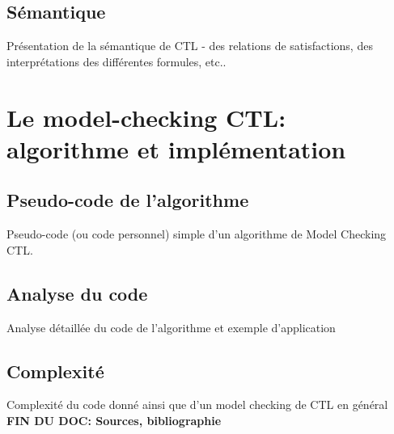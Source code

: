\documentclass[runningheads,a4paper,10pt]{llncs}
\begin{document}
\subsection{Sémantique}
Présentation de la sémantique de CTL - des relations de satisfactions, des interprétations des différentes formules, etc.. 

\section{Le model-checking CTL: algorithme et implémentation}
\subsection{Pseudo-code de l'algorithme}
Pseudo-code (ou code personnel) simple d'un algorithme de Model Checking CTL. 

\subsection{Analyse du code}
Analyse détaillée du code de l'algorithme et exemple d'application 

\subsection{Complexité}
Complexité du code donné ainsi que d'un model checking de CTL en général \\ 

\textbf{FIN DU DOC: Sources, bibliographie} 


\nocite{*}

\end{document}
